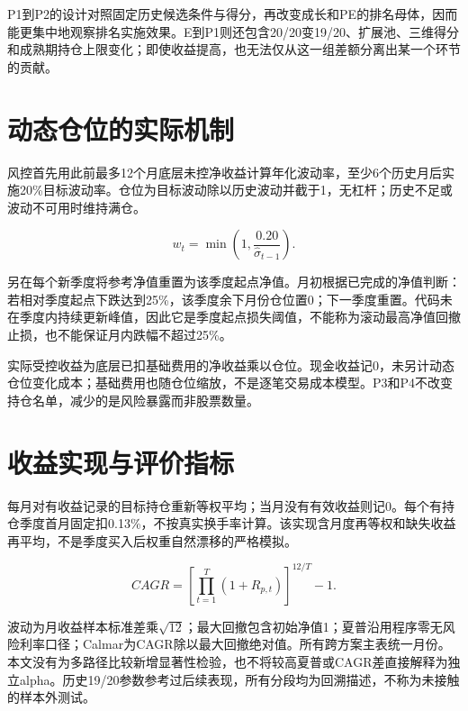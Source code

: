P1到P2的设计对照固定历史候选条件与得分，再改变成长和PE的排名母体，因而能更集中地观察排名实施效果。E到P1则还包含20/20变19/20、扩展池、三维得分和成熟期持仓上限变化；即使收益提高，也无法仅从这一组差额分离出某一个环节的贡献。

\section{动态仓位的实际机制}
风控首先用此前最多12个月底层未控净收益计算年化波动率，至少6个历史月后实施20\%目标波动率。仓位为目标波动除以历史波动并截于1，无杠杆；历史不足或波动不可用时维持满仓。

\begin{equation}
w_t=\min\left(1,\frac{0.20}{\hat{\sigma}_{t-1}}\right).
\label{eq:weight}
\end{equation}

另在每个新季度将参考净值重置为该季度起点净值。月初根据已完成的净值判断：若相对季度起点下跌达到25\%，该季度余下月份仓位置0；下一季度重置。代码未在季度内持续更新峰值，因此它是季度起点损失阈值，不能称为滚动最高净值回撤止损，也不能保证月内跌幅不超过25\%。

实际受控收益为底层已扣基础费用的净收益乘以仓位。现金收益记0，未另计动态仓位变化成本；基础费用也随仓位缩放，不是逐笔交易成本模型。P3和P4不改变持仓名单，减少的是风险暴露而非股票数量。

\section{收益实现与评价指标}
每月对有收益记录的目标持仓重新等权平均；当月没有有效收益则记0。每个有持仓季度首月固定扣0.13\%，不按真实换手率计算。该实现含月度再等权和缺失收益再平均，不是季度买入后权重自然漂移的严格模拟。

\begin{equation}
CAGR=\left[\prod_{t=1}^{T}(1+R_{p,t})\right]^{12/T}-1.
\label{eq:cagr}
\end{equation}

波动为月收益样本标准差乘$\sqrt{12}$；最大回撤包含初始净值1；夏普沿用程序零无风险利率口径；Calmar为CAGR除以最大回撤绝对值。所有跨方案主表统一月份。本文没有为多路径比较新增显著性检验，也不将较高夏普或CAGR差直接解释为独立alpha。历史19/20参数参考过后续表现，所有分段均为回溯描述，不称为未接触的样本外测试。
